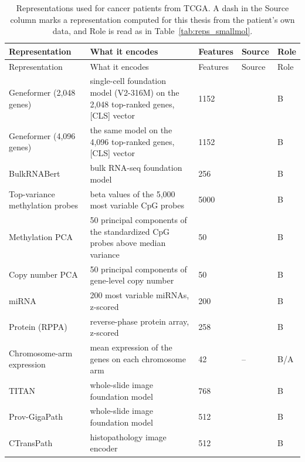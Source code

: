 {\let\small\footnotesize
\begin{longtable}{P{3.0cm}P{5.0cm}P{1.5cm}P{1.5cm}P{1.4cm}}
\caption[Representations used for cancer patients.]{Representations used for cancer patients from TCGA. A dash in the Source column marks a representation computed for this thesis from the patient's own data, and Role is read as in Table~\ref{tab:reps_smallmol}.}\label{tab:reps_tcga}\\
\toprule
Representation & What it encodes & Features & Source & Role \\
\midrule
\endfirsthead
\toprule
Representation & What it encodes & Features & Source & Role \\
\midrule
\endhead
\bottomrule
\endfoot
Geneformer (2,048 genes) & single-cell foundation model (V2-316M) on the 2,048 top-ranked genes, [CLS] vector & 1152 & \citep{Theodoris2023, Geneformer2024card} & B \\
Geneformer (4,096 genes) & the same model on the 4,096 top-ranked genes, [CLS] vector & 1152 & \citep{Theodoris2023, Geneformer2024card} & B \\
BulkRNABert & bulk RNA-seq foundation model & 256 & \citep{Gelard2024} & B \\
Top-variance methylation probes & beta values of the 5,000 most variable CpG probes & 5000 & \citep{Goldman2020} & B \\
Methylation PCA & 50 principal components of the standardized CpG probes above median variance & 50 & \citep{Goldman2020} & B \\
Copy number PCA & 50 principal components of gene-level copy number & 50 & \citep{Mermel2011} & B \\
miRNA & 200 most variable miRNAs, z-scored & 200 & \citep{Goldman2020} & B \\
Protein (RPPA) & reverse-phase protein array, z-scored & 258 & \citep{Li2013TCPA} & B \\
Chromosome-arm expression & mean expression of the genes on each chromosome arm & 42 & -- & B/A \\
TITAN & whole-slide image foundation model & 768 & \citep{Ding2024TITAN} & B \\
Prov-GigaPath & whole-slide image foundation model & 512 & \citep{Xu2024GigaPath} & B \\
CTransPath & histopathology image encoder & 512 & \citep{Wang2022CTransPath} & B \\

\end{longtable}}
